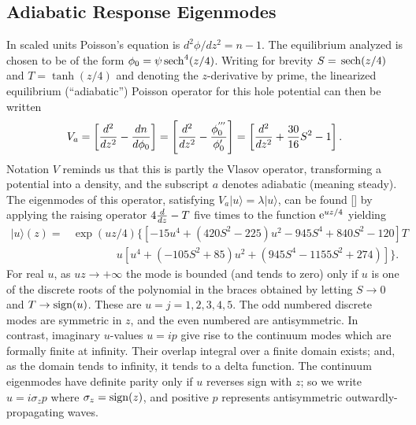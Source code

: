 \documentclass[12pt]{article}
\def\ket#1{|#1\rangle}
\def\sech{{\,\rm sech}}
\def\etothe#1{{\rm e}^{#1}}
\begin{document}
\subsection{Adiabatic Response Eigenmodes}
In scaled units Poisson's equation is $d^2\phi/dz^2=n-1$. The
equilibrium analyzed is chosen to be of the form
$\phi_0=\psi\sech^4(z/4)$. Writing for brevity
$S=\sech(z/4)$ and $T=\tanh(z/4)$ and denoting the $z$-derivative by
prime, the linearized equilibrium (``adiabatic'')
Poisson operator for this hole potential can then be written
\begin{equation}
  \label{eq:1}
  V_a = \left[{d^2\over dz^2} - {dn\over d\phi_0}\right]
  = \left[{d^2\over dz^2} - {\phi_0^{'''}\over \phi_0'}\right]
  = \left[{d^2\over dz^2} +{30\over 16}S^2- 1\right].
\end{equation}
Notation $V$ reminds us that this is partly the Vlasov operator,
transforming a potential into a density, and the subscript $a$ denotes
adiabatic (meaning steady).  The eigenmodes of this
operator, satisfying $V_a\ket{u}=\lambda \ket{u}$, can be found [] by
applying the raising operator $4 {d\over dz}-T$ five times to
the function $ \etothe{uz/4}$ yielding
\begin{equation}
  \label{eq:2}
  \begin{split}
 \ket{u}(z)= &\exp(uz/4)\{[-15u^4 + (420S^2 - 225)u^2 - 945S^4 +
 840S^2 - 120]T \\
 &\qquad\qquad u[u^4 + (-105S^2 + 85)u^2 + (945S^4 - 1155S^2
 +274)]\}.
\end{split}
\end{equation}
For real $u$, as $u z\to+\infty$ the mode is bounded (and tends to
zero) only if $u$ is one of the discrete roots of the polynomial in
the braces obtained by letting $S\to 0$ and $T\to {\rm sign}(u)$. These
are $u=j=1,2,3,4,5$. The odd numbered discrete modes are symmetric in
$z$, and the even numbered are antisymmetric. In contrast, imaginary
$u$-values $u=ip$ give rise to the continuum modes which are formally
finite at infinity. Their overlap integral over a finite domain
exists; and, as the domain tends to infinity, it tends to a delta
function. The continuum eigenmodes have definite parity only if $u$
reverses sign with $z$; so we write $u=i \sigma_z p$ where
$\sigma_z={\rm sign}(z)$, and positive $p$ represents antisymmetric
outwardly-propagating waves.
\end{document}
